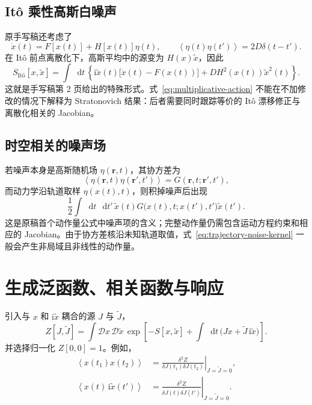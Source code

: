 \documentclass[UTF8,11pt,a4paper]{ctexart}
\newcommand{\dd}{\mathop{}\!\mathrm{d}}
\newcommand{\ii}{\mathrm{i}}
\newcommand{\D}{\mathcal D}
\newcommand{\avg}[1]{\left\langle #1\right\rangle}
\begin{document}
\subsection{It\^o 乘性高斯白噪声}

原手写稿还考虑了
\begin{equation}
  \dot x(t)=F[x(t)]+H[x(t)]\eta(t),
  \qquad
  \avg{\eta(t)\eta(t')}=2D\delta(t-t').
  \label{eq:multiplicative-langevin}
\end{equation}
在 It\^o 前点离散化下，高斯平均中的源变为 $H(x)\widetilde x$，因此
\begin{equation}
  \boxed{
  S_{\mathrm{It\hat{o}}}[x,\widetilde x]
  =\int\dd t\,
  \left\{
  \ii\widetilde x(t)\bigl[\dot x(t)-F(x(t))\bigr]
  +D H^2(x(t))\widetilde x^2(t)
  \right\}.
  }
  \label{eq:multiplicative-action}
\end{equation}
这就是手写稿第 2 页给出的特殊形式。式~\eqref{eq:multiplicative-action} 不能在不加修改的情况下解释为 Stratonovich 结果：后者需要同时跟踪等价的 It\^o 漂移修正与离散化相关的 Jacobian。

\subsection{时空相关的噪声场}

若噪声本身是高斯随机场 $\eta(\bm r,t)$，其协方差为
\begin{equation}
  \avg{\eta(\bm r,t)\eta(\bm r',t')}
  =G(\bm r,t;\bm r',t'),
\end{equation}
而动力学沿轨道取样 $\eta(x(t),t)$，则积掉噪声后出现
\begin{equation}
  \frac12\int\dd t\,\dd t'\,
  \widetilde x(t)
  G\bigl(x(t),t;x(t'),t'\bigr)
  \widetilde x(t').
  \label{eq:trajectory-noise-kernel}
\end{equation}
这是原稿首个动作量公式中噪声项的含义；完整动作量仍需包含运动方程约束和相应的 Jacobian。由于协方差核沿未知轨道取值，式~\eqref{eq:trajectory-noise-kernel} 一般会产生非局域且非线性的动作量。

\section{生成泛函数、相关函数与响应}

引入与 $x$ 和 $\ii\widetilde x$ 耦合的源 $J$ 与 $\widetilde J$，
\begin{equation}
  Z[J,\widetilde J]
  =\int\D x\,\D\widetilde x\,
  \exp\!\left[
  -S[x,\widetilde x]
  +\int\dd t\,
  \bigl(Jx+\widetilde J\,\ii\widetilde x\bigr)
  \right].
  \label{eq:generating-functional}
\end{equation}
并选择归一化 $Z[0,0]=1$。例如，
\begin{align}
  \avg{x(t_1)x(t_2)}
  &=\left.
    \frac{\delta^2 Z}{\delta J(t_1)\delta J(t_2)}
    \right|_{J=\widetilde J=0},
  \\
  \avg{x(t)\,\ii\widetilde x(t')}
  &=\left.
    \frac{\delta^2 Z}{\delta J(t)\delta\widetilde J(t')}
    \right|_{J=\widetilde J=0}.
\end{align}
\end{document}

